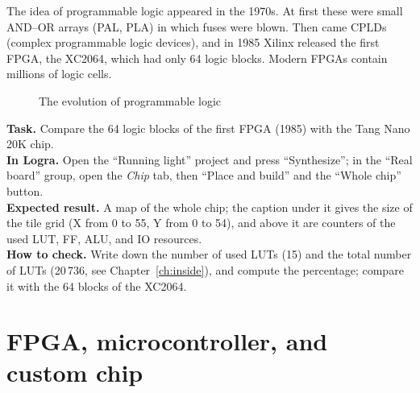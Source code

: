 The idea of programmable logic appeared in the 1970s. At first these were
small AND--OR arrays (PAL, PLA) in which fuses were blown.
Then came CPLDs (complex programmable logic devices), and in 1985 Xilinx
released the first FPGA, the XC2064, which had only 64 logic blocks.
Modern FPGAs contain millions of logic cells.

\begin{figure}[H]
\centering
{}
\caption{The evolution of programmable logic}
\end{figure}

\begin{diybox}
\textbf{Task.} Compare the 64 logic blocks of the first FPGA (1985) with the Tang Nano 20K chip.\\
\textbf{In Logra.} Open the ``Running light'' project and press ``Synthesize''; in the ``Real board'' group, open the \emph{Chip} tab, then ``Place and build'' and the ``Whole chip'' button.\\
\textbf{Expected result.} A map of the whole chip; the caption under it gives the size of the tile grid (X from 0 to 55, Y from 0 to 54), and above it are counters of the used LUT, FF, ALU, and IO resources.\\
\textbf{How to check.} Write down the number of used LUTs (15) and the total number of LUTs (20\,736, see Chapter~\ref{ch:inside}), and compute the percentage; compare it with the 64 blocks of the XC2064.
\end{diybox}

\section{FPGA, microcontroller, and custom chip}

